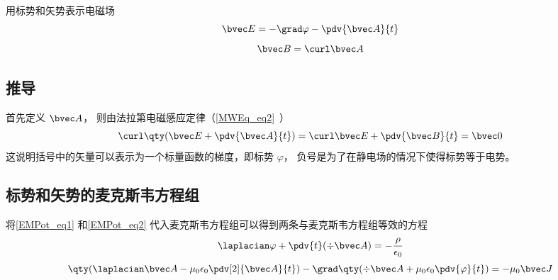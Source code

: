 
\begin{issues}
\issueDraft
\end{issues}


用标势和矢势表示电磁场
\begin{equation}\label{EMPot_eq1}
\bvec E = -\grad \varphi - \pdv{\bvec A}{t}
\end{equation}
\begin{equation}\label{EMPot_eq2}
\bvec B = \curl \bvec A
\end{equation}

\subsection{推导}
首先定义 $\bvec A$， 则由法拉第电磁感应定律（\autoref{MWEq_eq2}~）
\begin{equation}
\curl \qty(\bvec E + \pdv{\bvec A}{t}) = \curl \bvec E + \pdv{\bvec B}{t} = \bvec 0
\end{equation}
这说明括号中的矢量可以表示为一个标量函数的梯度，即标势 $\varphi$， 负号是为了在静电场的情况下使得标势等于电势。

\subsection{标势和矢势的麦克斯韦方程组}

将\autoref{EMPot_eq1} 和\autoref{EMPot_eq2} 代入麦克斯韦方程组可以得到两条与麦克斯韦方程组等效的方程
\begin{equation}\label{EMPot_eq4}
\laplacian \varphi + \pdv{t} (\div \bvec A) = -\frac{\rho}{\epsilon_0}
\end{equation}
\begin{equation}\label{EMPot_eq5}
\qty(\laplacian \bvec A - \mu_0\epsilon_0 \pdv[2]{\bvec A}{t}) - \grad \qty(\div \bvec A + \mu_0\epsilon_0 \pdv{\varphi}{t}) = -\mu_0\bvec J
\end{equation}

